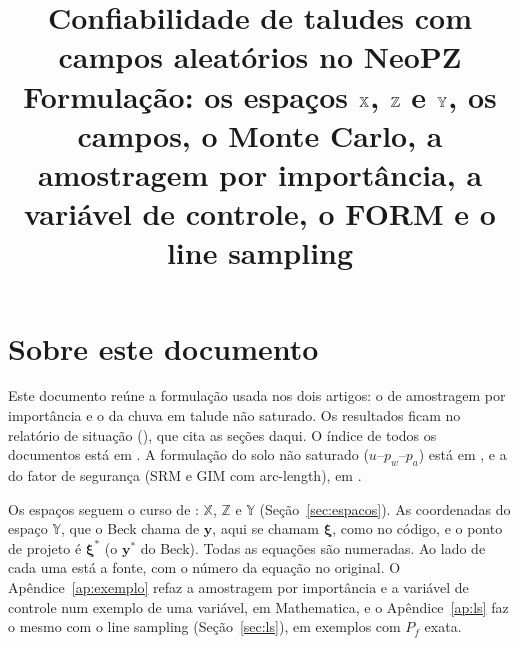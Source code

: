 \documentclass[11pt,a4paper]{article}
\title{Confiabilidade de taludes com campos aleatórios no NeoPZ\\\large Formulação: os espaços $\X$, $\Z$ e $\Y$, os
campos, o Monte Carlo, a amostragem por importância, a variável de controle, o FORM e o line sampling}
\date{\versao}
\newcommand{\X}{\mathbb{X}}
\newcommand{\Z}{\mathbb{Z}}
\newcommand{\Y}{\mathbb{Y}}
\newcommand{\xib}{\bm\xi}
\begin{document}
\maketitle
\tableofcontents
\linenumbers

\section*{Sobre este documento}
Este documento reúne a formulação usada nos dois artigos: o de amostragem por importância e o da chuva em talude não
saturado. Os resultados ficam no relatório de situação (), que cita
as seções daqui. O índice de todos os documentos está em . A formulação do solo
não saturado ($u$--$p_w$--$p_a$) está em , e a do fator de segurança (SRM e GIM com
arc-length), em .

Os espaços seguem o curso de \citet{beck2014}: $\X$, $\Z$ e $\Y$ (Seção~\ref{sec:espacos}). As coordenadas do espaço
$\Y$, que o Beck chama de $\bm y$, aqui se chamam $\xib$, como no código, e o ponto de projeto é $\xib^*$ (o $\bm y^*$ do
Beck). Todas as equações são numeradas. Ao lado de cada uma está a fonte, com o número da equação no original. O
Apêndice~\ref{ap:exemplo} refaz a amostragem por importância e a variável de controle num exemplo de uma variável, em
Mathematica, e o Apêndice~\ref{ap:ls} faz o mesmo com o line sampling (Seção~\ref{sec:ls}), em exemplos com $P_f$
exata.
\end{document}
